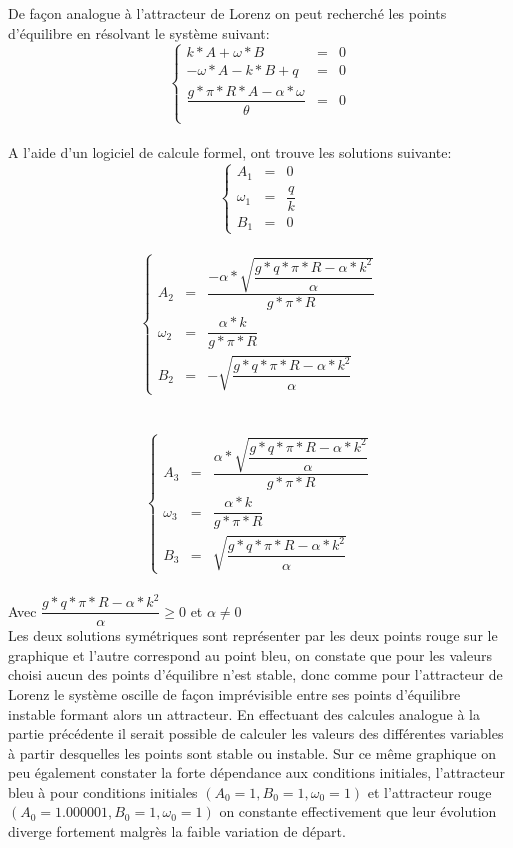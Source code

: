 De façon analogue à l'attracteur de Lorenz on peut recherché les points d'équilibre en résolvant le système suivant:\\
\[
    \left\{
    \begin{array}{rcl}
        k*A+\omega*B&=&0\\
        -\omega*A-k*B+q&=&0\\
        \dfrac{g*\pi*R*A-\alpha*\omega}{\theta }&=&0\\
    \end{array}
    \right.
\]\\

A l'aide d'un logiciel de calcule formel, ont trouve les solutions suivante:\\
\[
    \left\{
    \begin{array}{rcl}
        A_1&=&0\\
        \omega_1&=&\dfrac{q}{k}\\
        B_1&=&0

    \end{array}
    \right.
\]\\

\[
    \left\{
    \begin{array}{rcl}
        A_2&=&\dfrac{-\alpha*\sqrt{\dfrac{g*q*\pi*R-\alpha*k^2}{\alpha}}}{g*\pi*R}\\
        \omega_2&=&\dfrac{\alpha*k}{g*\pi*R}\\
        B_2&=&-\sqrt{\dfrac{g*q*\pi*R-\alpha*k^2}{\alpha}}

    \end{array}
    \right.
\]\\
\\
\[
    \left\{
    \begin{array}{rcl}
        A_3&=&\dfrac{\alpha*\sqrt{\dfrac{g*q*\pi*R-\alpha*k^2}{\alpha}}}{g*\pi*R}\\
        \omega_3&=&\dfrac{\alpha*k}{g*\pi*R}\\
        B_3&=&\sqrt{\dfrac{g*q*\pi*R-\alpha*k^2}{\alpha}}

    \end{array}
    \right.
\]\\

Avec $\dfrac{g*q*\pi*R-\alpha*k^2}{\alpha} \geq 0$ et $\alpha\neq 0$\\

Les deux solutions symétriques sont représenter par les deux points rouge sur le graphique et l'autre correspond au point bleu, on constate que pour les valeurs choisi aucun des points d'équilibre n'est stable, donc comme pour l'attracteur de Lorenz le système oscille de façon imprévisible entre ses points d'équilibre instable formant alors un attracteur. En effectuant des calcules analogue à la partie précédente il serait possible de calculer les valeurs des différentes variables à partir desquelles les points sont stable ou instable. 
Sur ce même graphique on peu également constater la forte dépendance aux conditions initiales, l'attracteur bleu à pour conditions initiales $(A_0=1,B_0=1,\omega_0=1)$ et l'attracteur rouge $(A_0=1.000001,B_0=1,\omega_0=1)$ on constante effectivement que leur évolution diverge fortement malgrès la faible variation de départ.




